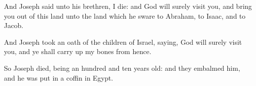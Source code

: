\verse And Joseph said unto his brethren, I die: and God will surely visit you, and bring you out of this land unto the land which he sware to Abraham, to Isaac, and to Jacob.

\verse And Joseph took an oath of the children of Israel, saying, God will surely visit you, and ye shall carry up my bones from hence.

\verse So Joseph died, being an hundred and ten years old: and they embalmed him, and he was put in a coffin in Egypt.

